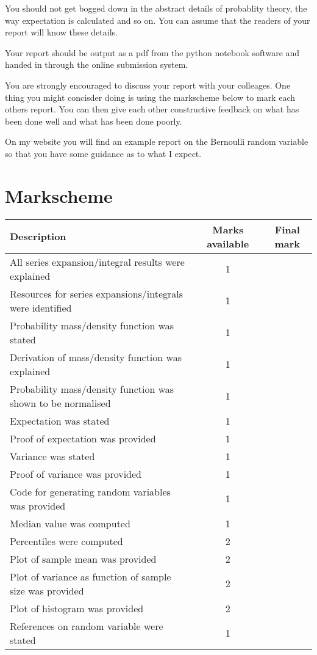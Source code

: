 \documentclass[paper=a4, fontsize=11pt]{scrartcl}
\numberwithin{equation}{section}
\numberwithin{figure}{section}
\numberwithin{table}{section}
\begin{document}
You should not get bogged down in the abstract details of probablity theory, the way expectation is calculated and so on.  You can assume that the readers of your report will know these details.

Your report should be output as a pdf from the python notebook software and handed in through the online submission system.

You are strongly encouraged to discuss your report with your colleages.  One thing you might concisder doing is using the markscheme below to mark each others report.  You can then give each other 
constructive feedback on what has been done well and what has been done poorly.

On my website you will find an example report on the Bernoulli random variable so that you have some guidance as to what I expect.

\section{Markscheme}

\begin{center}
\begin{tabular}{ l | c | c }
Description & Marks available & Final mark \\ \hline
All series expansion/integral results were explained & 1 &  \\
Resources for series expansions/integrals were identified & 1 & \\
Probability mass/density function was stated & 1 & \\
Derivation of mass/density function was explained & 1 & \\
Probability mass/density function was shown to be normalised & 1 & \\
Expectation was stated & 1 & \\
Proof of expectation was provided & 1 & \\
Variance was stated & 1 & \\
Proof of variance was provided & 1 &  \\
Code for generating random variables was provided & 1 & \\
Median value was computed & 1 & \\ 
Percentiles were computed & 2 & \\ 
Plot of sample mean was provided & 2 & \\
Plot of variance as function of sample size was provided & 2 & \\
Plot of histogram was provided & 2 & \\
References on random variable were stated & 1 &
\end{tabular}
\end{center}
\end{document}
